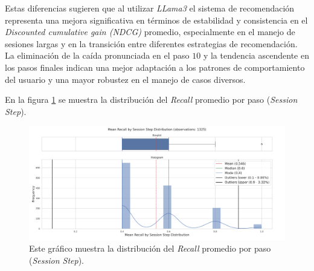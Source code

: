 \documentclass[11pt,a4paper,twoside]{thesis}
\begin{document}
Estas diferencias sugieren que al utilizar \textit{LLama3} el sistema de recomendación representa una mejora significativa en términos de estabilidad y consistencia en el \textit{Discounted cumulative gain (NDCG)} promedio, especialmente en el manejo de sesiones largas y en la transición entre diferentes estrategias de recomendación. La eliminación de la caída pronunciada en el paso $10$ y la tendencia ascendente en los pasos finales indican una mejor adaptación a los patrones de comportamiento del usuario y una mayor robustez en el manejo de casos diversos.


\clearpage

En la figura \ref{fig:llama3-mean_recall_by_session_step_distribution} se muestra la distribución del \textit{Recall} promedio por paso (\textit{Session Step}).


\begin{figure}[H]
	\centering
	\includegraphics[width=15cm]{./images/llama3/mean_recall_by_session_step_distribution.png}
	\caption{Este gráfico muestra la distribución del \textit{Recall} promedio por paso (\textit{Session Step}).}
	\label{fig:llama3-mean_recall_by_session_step_distribution}
\end{figure}
\end{document}
